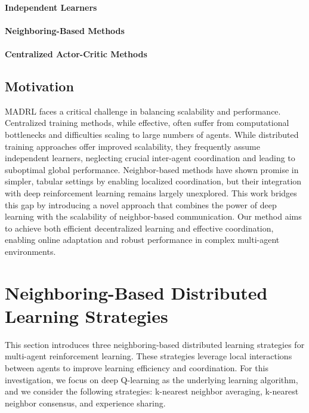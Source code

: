 \documentclass[sigconf]{acmart}
\begin{document}
\paragraph{Independent Learners}

\paragraph{Neighboring-Based Methods}
\paragraph{Centralized Actor-Critic Methods}

\subsection{Motivation}
MADRL faces a critical challenge in balancing scalability and performance.  
Centralized training methods, while effective, often suffer from computational bottlenecks and difficulties scaling to large numbers of agents. 
While distributed training approaches offer improved scalability, 
they frequently assume independent learners, 
neglecting crucial inter-agent coordination and leading to suboptimal global performance.  
%
Neighbor-based methods have shown promise in simpler, tabular settings by enabling localized coordination,
but their integration with deep reinforcement learning remains largely unexplored. 
This work bridges this gap by introducing a novel approach that combines the power of deep learning with the scalability of neighbor-based communication.  
Our method aims to achieve both efficient decentralized learning and effective coordination, enabling online adaptation and robust performance in complex multi-agent environments.
\section{Neighboring-Based Distributed Learning Strategies}\label{sec:neighboring}
This section introduces three neighboring-based distributed learning strategies for multi-agent reinforcement learning. 
These strategies leverage local interactions between agents to improve learning efficiency and coordination.
For this investigation, we focus on deep Q-learning as the underlying learning algorithm,
and we consider the following strategies:
 k-nearest neighbor averaging, k-nearest neighbor consensus, and experience sharing.
\end{document}
